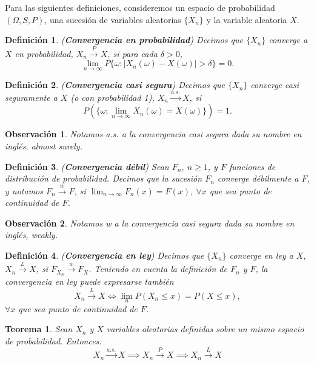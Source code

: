 \documentclass{report}
\newtheorem{thm}{Teorema}[section]
\newtheorem{dfn}{Definición}[section]
\newtheorem{obs}{Observación}[section]
\begin{document}
Para las siguientes definiciones, consideremos un espacio de probabilidad $(\Omega, S, P)$, 
una sucesión de variables aleatorias $\{X_n\}$ y la variable aleatoria $X$.

\begin{dfn} \label{dfn:conv_prob} (\textbf{Convergencia en probabilidad}) 
    Decimos que $\{X_n\}$ converge a $X$ en probabilidad, $X_n \xrightarrow{P} X$, si para cada $\delta > 0$,
\[
\lim_{n\rightarrow \infty} P\{\omega : |X_n(\omega) - X(\omega)| > \delta \} = 0.
\]
\end{dfn}

\begin{dfn} \label{dfn:conv_cs}(\textbf{Convergencia casi segura}) Decimos que $\{X_n\}$ converge casi seguramente a $X$ (o con probabilidad 1), $X_n \xrightarrow{a.s.} X$, si
\[
P(\{\omega : \lim_{n\rightarrow \infty} X_n(\omega) = X(\omega)\}) = 1.
\]
\end{dfn}
\begin{obs}
    Notamos \emph{a.s.} a la convergencia casi segura dada su nombre en inglés, \emph{almost surely}. 
\end{obs}

\begin{dfn} \label{dfn:conv_debil} (\textbf{Convergencia débil}) Sean $F_n$, $n \geq 1$, y 
    $F$ funciones de distribución de probabilidad. Decimos que la sucesión $F_n$ converge \emph{débilmente} a $F$, y notamos $F_n \xrightarrow{w} F$, 
    si $\displaystyle\lim_{n\rightarrow\infty} F_n(x) = F(x)$, $\forall x$ que sea punto de continuidad de $F$.
\end{dfn}

\begin{obs}
    Notamos \emph{w} a la convergencia casi segura dada su nombre en inglés, \emph{weakly}. 
\end{obs}


\begin{dfn} \label{dfn:conv_ley} (\textbf{Convergencia en ley}) Decimos que $\{X_n\}$ converge en ley a $X$, 
    $X_n \xrightarrow{L} X$, si $F_{X_n} \xrightarrow{w} F_X$. Teniendo en cuenta la definición de $F_n$ y $F$, la convergencia en ley puede expresarse también
\[
X_n \xrightarrow{L} X \iff \lim_n P(X_n \leq x) = P(X \leq x),
\]
$\forall x$ que sea punto de continuidad de $F$.
\end{dfn}


\begin{thm} \label{thm:rel_convergencias}  Sean $X_n$ y $X$ variables aleatorias definidas sobre un mismo espacio de probabilidad. Entonces:
\[
X_n \xrightarrow{a.s.} X \implies X_n \xrightarrow{P} X \implies X_n \xrightarrow{L} X
\]
\end{thm}
\end{document}
